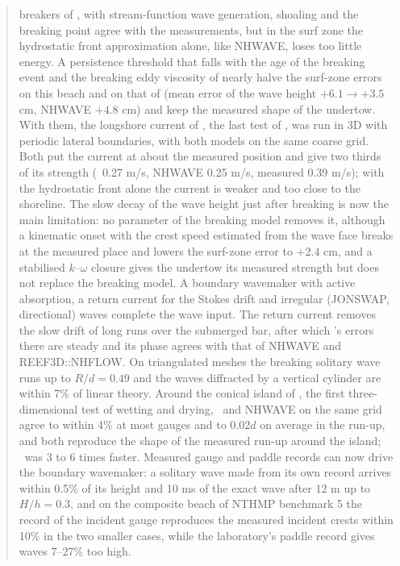 \begin{abstract}
breakers of \citet{ting1994}, with stream-function wave generation, shoaling
and the breaking point agree with the measurements, but in the surf zone the
hydrostatic front approximation alone, like NHWAVE, loses too little energy.
A persistence threshold that falls with the age of the breaking event and
the breaking eddy viscosity of \citet{kennedy2000} nearly halve the surf-zone
errors on this beach and on that of \citet{hansen1979} (mean error of the
wave height $+6.1 \to +3.5$ cm, NHWAVE $+4.8$ cm) and keep the measured shape
of the undertow. With them, the longshore current of \citet{visser1991}, the
last test of \citet{ma2012}, was run in 3D with periodic lateral boundaries,
with both models on the same coarse grid. Both put the current at about the
measured position and give two thirds of its strength (\NHFOAM\ 0.27 m/s,
NHWAVE 0.25 m/s, measured 0.39 m/s); with the hydrostatic front alone the
current is weaker and too close to the shoreline. The slow decay of the wave
height just after breaking is now the main limitation: no parameter of the
breaking model removes it, although a kinematic onset with the crest speed
estimated from the wave face breaks at the measured place and lowers the
surf-zone error to $+2.4$ cm, and a stabilised $k$--$\omega$ closure gives
the undertow its measured strength but does not replace the breaking model.
A boundary wavemaker with active absorption, a return current for the
Stokes drift and irregular (JONSWAP, directional) waves complete the wave
input. The return current removes the slow drift of long runs over the
submerged bar, after which \NHFOAM's errors there are steady and its phase
agrees with that of NHWAVE and REEF3D::NHFLOW. On triangulated meshes the
breaking solitary wave runs up to $R/d = 0.49$ and the waves diffracted by
a vertical cylinder are within 7\% of linear theory. Around the conical
island of \citet{briggs1995}, the first three-dimensional test of wetting and
drying, \NHFOAM\ and NHWAVE on the same grid agree to within 4\% at most
gauges and to $0.02d$ on average in the run-up, and both reproduce the shape
of the measured run-up around the island; \NHFOAM\ was 3 to 6 times faster.
Measured gauge and paddle records can now drive the boundary wavemaker: a
solitary wave made from its own record arrives within 0.5\% of its height
and 10 ms of the exact wave after 12 m up to $H/h = 0.3$, and on the
composite beach of NTHMP benchmark 5 the record of the incident gauge
reproduces the measured incident crests within 10\% in the two smaller
cases, while the laboratory's paddle record gives waves 7--27\% too high.

\end{abstract}

